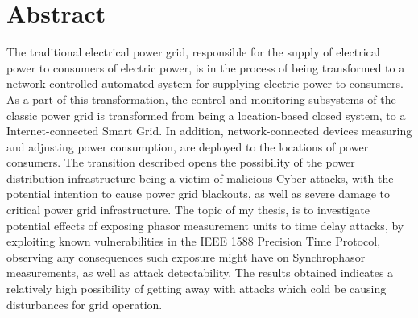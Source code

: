 \chapter*{Abstract}



The traditional electrical power grid, responsible for the supply of electrical power to consumers of electric power, is in the process of being transformed to a network-controlled automated system for supplying electric power to consumers.
As a part of this transformation, the control and monitoring subsystems of the classic power grid is transformed from being a location-based closed system, to a Internet-connected Smart Grid. In addition, network-connected devices measuring and adjusting power consumption, are deployed to the locations of power consumers.
The transition described opens the possibility of the power distribution infrastructure being a victim of malicious Cyber attacks, with the potential intention to cause power grid blackouts, as well as severe damage to critical power grid infrastructure. The topic of my thesis, is to investigate potential effects of exposing phasor measurement units to time delay attacks, by exploiting known vulnerabilities in the IEEE 1588 Precision Time Protocol, observing any consequences such exposure might have on Synchrophasor measurements, as well as attack detectability.
The results obtained indicates a relatively high possibility of getting away with attacks which cold be causing disturbances for grid operation. 

